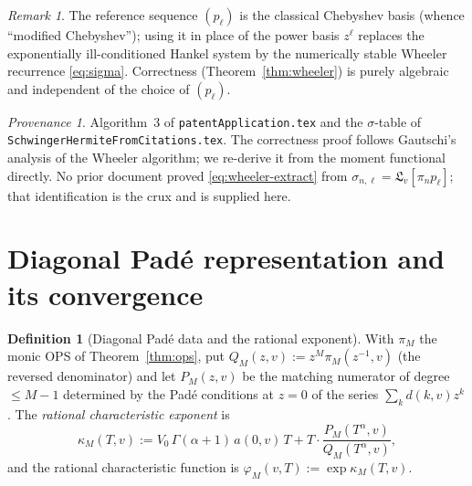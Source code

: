 \documentclass[11pt]{article}
\theoremstyle{plain}
\theoremstyle{definition}
\newtheorem{definition}[theorem]{Definition}
\theoremstyle{remark}
\newtheorem*{provenance}{Provenance}
\newtheorem*{remarknote}{Remark}
\begin{document}
\begin{remarknote}
The reference sequence $(p_\ell)$ is the classical Chebyshev basis (whence
``modified Chebyshev''); using it in place of the power basis $z^\ell$ replaces
the exponentially ill-conditioned Hankel system by the numerically stable Wheeler
recurrence \eqref{eq:sigma}. Correctness (Theorem~\ref{thm:wheeler}) is purely
algebraic and independent of the choice of $(p_\ell)$.
\end{remarknote}

\begin{provenance}
Algorithm~3 of \texttt{patentApplication.tex} and the $\sigma$-table of
\texttt{SchwingerHermiteFromCitations.tex}. The correctness proof follows
Gautschi's analysis of the Wheeler algorithm; we re-derive it from the moment
functional directly. No prior document proved \eqref{eq:wheeler-extract} from
$\sigma_{n,\ell}=\mathfrak L_v[\pi_n p_\ell]$; that identification is the crux and
is supplied here.
\end{provenance}

\section{Diagonal Padé representation and its convergence}
\label{sec:pade}

\begin{definition}[Diagonal Padé data and the rational exponent]\label{def:kappaM}
With $\pi_M$ the monic OPS of Theorem~\ref{thm:ops}, put
$Q_M(z,v):=z^M\pi_M(z^{-1},v)$ (the reversed denominator) and let $P_M(z,v)$ be
the matching numerator of degree $\le M-1$ determined by the Padé conditions at
$z=0$ of the series $\sum_k d(k,v)z^k$. The \emph{rational characteristic
exponent} is
\begin{equation}\label{eq:kappaM}
   \kappa_M(T,v):=V_0\,\Gamma(\alpha+1)\,a(0,v)\,T
   +T\cdot\frac{P_M(T^\alpha,v)}{Q_M(T^\alpha,v)},
\end{equation}
and the rational characteristic function is $\varphi_M(v,T):=\exp\kappa_M(T,v)$.
\end{definition}
\end{document}
